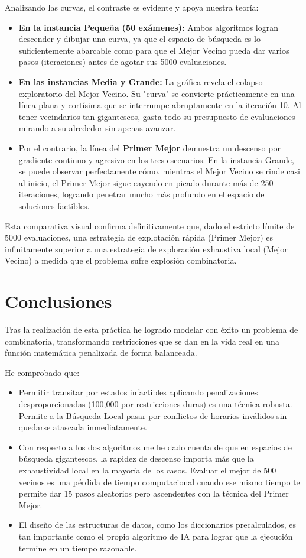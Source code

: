 \documentclass[12pt]{article}
\begin{document}
Analizando las curvas, el contraste es evidente y apoya nuestra teoría:
\begin{itemize}
    \item \textbf{En la instancia Pequeña (50 exámenes):} Ambos algoritmos logran descender y dibujar una curva, ya que el espacio de búsqueda es lo suficientemente abarcable como para que el Mejor Vecino pueda dar varios pasos (iteraciones) antes de agotar sus 5000 evaluaciones.
    \item \textbf{En las instancias Media y Grande:} La gráfica revela el colapso exploratorio del Mejor Vecino. Su "curva" se convierte prácticamente en una línea plana y cortísima que se interrumpe abruptamente en la iteración 10. Al tener vecindarios tan gigantescos, gasta todo su presupuesto de evaluaciones mirando a su alrededor sin apenas avanzar.
    \item Por el contrario, la línea del \textbf{Primer Mejor} demuestra un descenso por gradiente continuo y agresivo en los tres escenarios. En la instancia Grande, se puede observar perfectamente cómo, mientras el Mejor Vecino se rinde casi al inicio, el Primer Mejor sigue cayendo en picado durante más de 250 iteraciones, logrando penetrar mucho más profundo en el espacio de soluciones factibles.
\end{itemize}

Esta comparativa visual confirma definitivamente que, dado el estricto límite de 5000 evaluaciones, una estrategia de explotación rápida (Primer Mejor) es infinitamente superior a una estrategia de exploración exhaustiva local (Mejor Vecino) a medida que el problema sufre explosión combinatoria.

\section{Conclusiones}
Tras la realización de esta práctica he logrado modelar con éxito un problema de combinatoria, transformando restricciones que se dan en la vida real en una función matemática penalizada de forma balanceada.

He comprobado que:
\begin{itemize}
    \item Permitir transitar por estados infactibles aplicando penalizaciones desproporcionadas (100,000 por restricciones duras) es una técnica robusta. Permite a la Búsqueda Local pasar por conflictos de horarios inválidos sin quedarse atascada inmediatamente.
    \item Con respecto a los dos algoritmos me he dado cuenta de que en espacios de búsqueda gigantescos, la rapidez de descenso importa más que la exhaustividad local en la mayoría de los casos. Evaluar el mejor de 500 vecinos es una pérdida de tiempo computacional cuando ese mismo tiempo te permite dar 15 pasos aleatorios pero ascendentes con la técnica del Primer Mejor.
    \item El diseño de las estructuras de datos, como los diccionarios precalculados, es tan importante como el propio algoritmo de IA para lograr que la ejecución termine en un tiempo razonable.
\end{itemize}
\end{document}
